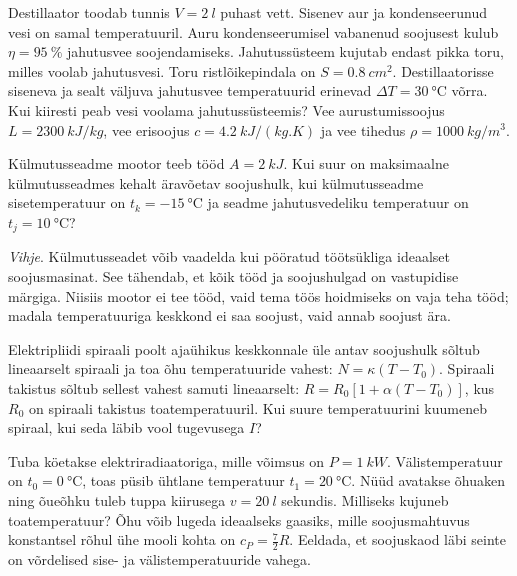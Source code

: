 \documentclass[10pt]{article}
\begin{document}
{
Destillaator toodab tunnis $V=\SI{2}{l}$ puhast vett. Sisenev aur ja kondenseerunud vesi on samal temperatuuril. Auru kondenseerumisel vabanenud soojusest kulub $\eta=\SI{95}{\%}$ jahutusvee soojendamiseks. Jahutussüsteem kujutab endast pikka toru, milles voolab jahutusvesi. Toru ristlõikepindala on $S=\SI{0,8}{cm^2}$. Destillaatorisse siseneva ja sealt väljuva jahutusvee temperatuurid erinevad $\Delta T=\SI{30}{\degreeCelsius}$ võrra. Kui kiiresti peab vesi voolama jahutussüsteemis? Vee aurustumissoojus $L=\SI{2300}{kJ/kg}$, vee erisoojus $c = \SI{4,2}{kJ/(kg.K)}$ ja vee tihedus $\rho=\SI{1000}{kg/m^3}$.
\probend
\bigskip


Külmutusseadme mootor teeb tööd $A = \SI{2}{kJ}$. Kui suur on maksimaalne külmutusseadmes kehalt äravõetav soojushulk, kui külmutusseadme sisetemperatuur on $t_k = \SI{-15}{\degreeCelsius}$ ja seadme jahutusvedeliku temperatuur on $t_j = \SI{10}{\degreeCelsius}$?

\emph{Vihje}.
Külmutusseadet võib vaadelda kui pööratud töötsükliga ideaalset soojusmasinat. See tähendab, et kõik tööd ja soojushulgad on vastupidise märgiga.
Niisiis mootor ei tee tööd, vaid tema töös hoidmiseks on vaja teha tööd; madala
temperatuuriga keskkond ei saa soojust, vaid annab soojust ära.
\probend
\bigskip


Elektripliidi spiraali poolt ajaühikus keskkonnale üle antav soojushulk sõltub lineaarselt spiraali ja toa õhu temperatuuride vahest: $N = \kappa (T - T_0)$. Spiraali takistus sõltub sellest vahest samuti lineaarselt: $R = R_0 [1+\alpha (T -T_0)]$, kus $R_0$ on spiraali takistus toatemperatuuril. Kui suure temperatuurini kuumeneb spiraal, kui seda läbib vool tugevusega $I$?
\probend
\bigskip


Tuba köetakse elektriradiaatoriga, mille võimsus on $P=\SI{1}{kW}$. Välistemperatuur on $t_0=\SI{0}{\degreeCelsius}$, toas püsib ühtlane temperatuur $t_1=\SI{20}{\degreeCelsius}$.
Nüüd avatakse õhuaken ning õueõhku tuleb tuppa kiirusega $v=\SI{20}{l}$ sekundis. Milliseks kujuneb toatemperatuur? Õhu võib lugeda ideaalseks gaasiks,
mille soojusmahtuvus konstantsel rõhul ühe mooli kohta on $c_P=\frac 72R$. Eeldada, et soojuskaod läbi seinte on võrdelised sise- ja välistemperatuuride vahega.
\probend
\bigskip

}
\end{document}

